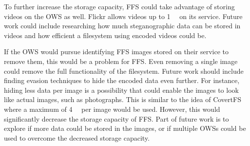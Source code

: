 To further increase the storage capacity, \gls{FFS} could take advantage of storing videos on the \gls{OWS} as well. Flickr allows videos up to \SI[per-mode = symbol]{1}{\giga\byte} on its service. Future work could include researching how much steganographic data can be stored in videos and how efficient a filesystem using encoded videos could be.

If the \gls{OWS} would pursue identifying \gls{FFS} images stored on their service to remove them, this would be a problem for \gls{FFS}. Even removing a single image could remove the full functionality of the filesystem. Future work should include finding evasion techniques to hide the encoded data even further. For instance, hiding less data per image is a possibility that could enable the images to look like actual images, such as photographs. This is similar to the idea of CovertFS\,\cite{baliga2007web} where a maximum of \SI[per-mode = symbol]{4}{\kilo\byte} per image would be used. However, this would significantly decrease the storage capacity of \gls{FFS}. Part of future work is to explore if more data could be stored in the images, or if multiple \glspl{OWS} could be used to overcome the decreased storage capacity. 

%
%